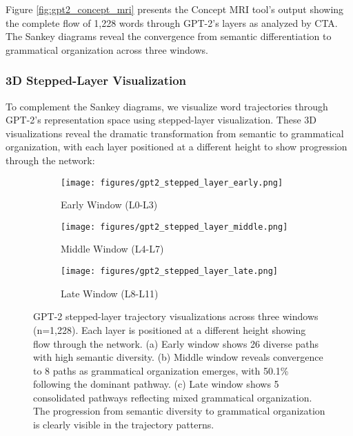 Figure \ref{fig:gpt2_concept_mri} presents the Concept MRI tool's output showing the complete flow of 1,228 words through GPT-2's layers as analyzed by CTA. The Sankey diagrams reveal the convergence from semantic differentiation to grammatical organization across three windows.



\subsubsection{3D Stepped-Layer Visualization}

To complement the Sankey diagrams, we visualize word trajectories through GPT-2's representation space using stepped-layer visualization. These 3D visualizations reveal the dramatic transformation from semantic to grammatical organization, with each layer positioned at a different height to show progression through the network:

\begin{figure}[ht]
    \centering
    \begin{subfigure}[b]{0.32\textwidth}
        \texttt{[image: figures/gpt2\_stepped\_layer\_early.png]}
        \caption{Early Window (L0-L3)}
        \label{fig:gpt2_traj_early}
    \end{subfigure}
    \hfill
    \begin{subfigure}[b]{0.32\textwidth}
        \texttt{[image: figures/gpt2\_stepped\_layer\_middle.png]}
        \caption{Middle Window (L4-L7)}
        \label{fig:gpt2_traj_middle}
    \end{subfigure}
    \hfill
    \begin{subfigure}[b]{0.32\textwidth}
        \texttt{[image: figures/gpt2\_stepped\_layer\_late.png]}
        \caption{Late Window (L8-L11)}
        \label{fig:gpt2_traj_late}
    \end{subfigure}
    \caption{GPT-2 stepped-layer trajectory visualizations across three windows (n=1,228). Each layer is positioned at a different height showing flow through the network. (a) Early window shows 26 diverse paths with high semantic diversity. (b) Middle window reveals convergence to 8 paths as grammatical organization emerges, with 50.1\% following the dominant pathway. (c) Late window shows 5 consolidated pathways reflecting mixed grammatical organization. The progression from semantic diversity to grammatical organization is clearly visible in the trajectory patterns.}
    \label{fig:gpt2_trajectories}
\end{figure}


